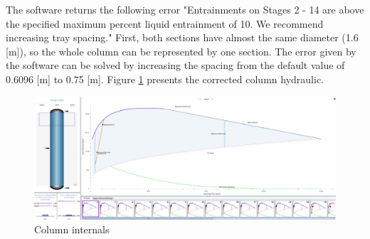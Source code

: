The software returns the following error "Entrainments on Stages 2 - 14 are above the specified maximum percent liquid entrainment of 10. We recommend increasing tray spacing." First, both sections have almost the same diameter (1.6 [m]), so the whole column can be represented by one section. The error given by the software can be solved by increasing the spacing from the default value of 0.6096 [m] to 0.75 [m]. Figure \ref{fig:Ester_Col_hydrarulic_manual} presents the corrected column hydraulic.

\begin{figure}[H]
	\centering
	\includegraphics[width=\textwidth]{Figures/Proces_Analysis/Column_Design_Manual.jpg}
	\caption{Column internals}
	\label{fig:Ester_Col_hydrarulic_manual}
\end{figure}






